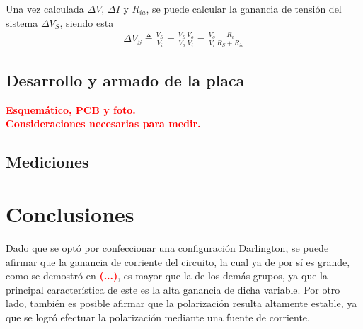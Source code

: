 Una vez calculada $\Delta V$, $\Delta I$ y $R_{ia}$, se puede calcular la ganancia de tensión del sistema $\Delta V_S$, siendo esta
\begin{equation}
\begin{split}
	\Delta V_S \triangleq \frac{V_S}{V_i} = \frac{V_S}{V_o} \frac{V_o}{V_i} = \frac{V_o}{V_i} \frac{R_i}{R_S + R_{ia}}
\end{split}
\label{equ:vs}
\end{equation}

\subsection{Desarrollo y armado de la placa}
\begin{center}
	\LARGE{\textcolor{red}{\textbf{Esquemático, PCB y foto.}}}\\
	\LARGE{\textcolor{red}{\textbf{Consideraciones necesarias para medir.}}}
\end{center}

\subsection{Mediciones}

\section{Conclusiones}
Dado que se optó por confeccionar una configuración Darlington, se puede afirmar que la ganancia de corriente del circuito, la cual ya de por sí es grande, como se demostró en \textcolor{red}{\textbf{(...)}}, es mayor que la de los demás grupos, ya que la principal característica de este es la alta ganancia de dicha variable. Por otro lado, también es posible afirmar que la polarización resulta altamente estable, ya que se logró efectuar la polarización mediante una fuente de corriente.
	
